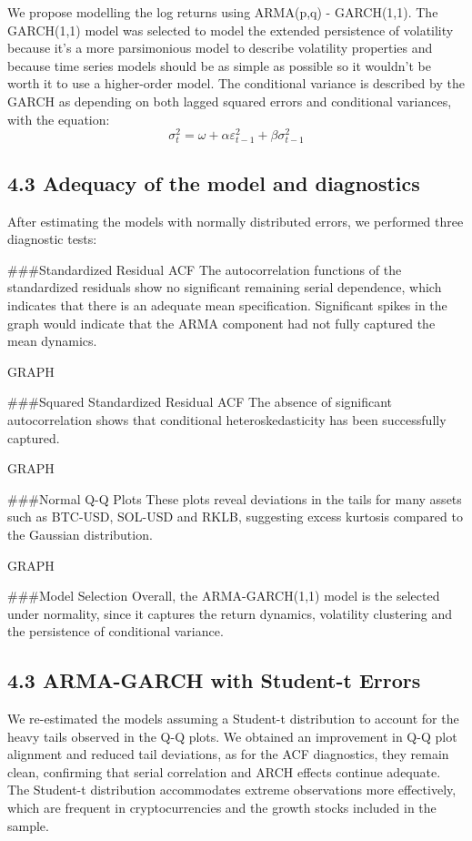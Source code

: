 \documentclass[
]{article}
\begin{document}
We propose modelling the log returns using ARMA(p,q) - GARCH(1,1). The
GARCH(1,1) model was selected to model the extended persistence of
volatility because it's a more parsimonious model to describe volatility
properties and because time series models should be as simple as
possible so it wouldn't be worth it to use a higher-order model. The
conditional variance is described by the GARCH as depending on both
lagged squared errors and conditional variances, with the equation: \[
\sigma_t^2 = \omega + \alpha \varepsilon_{t-1}^2 + \beta \sigma_{t-1}^2
\]

\subsection{4.3 Adequacy of the model and
diagnostics}\label{adequacy-of-the-model-and-diagnostics}

After estimating the models with normally distributed errors, we
performed three diagnostic tests:

\#\#\#Standardized Residual ACF The autocorrelation functions of the
standardized residuals show no significant remaining serial dependence,
which indicates that there is an adequate mean specification.
Significant spikes in the graph would indicate that the ARMA component
had not fully captured the mean dynamics.

GRAPH

\#\#\#Squared Standardized Residual ACF The absence of significant
autocorrelation shows that conditional heteroskedasticity has been
successfully captured.

GRAPH

\#\#\#Normal Q-Q Plots These plots reveal deviations in the tails for
many assets such as BTC-USD, SOL-USD and RKLB, suggesting excess
kurtosis compared to the Gaussian distribution.

GRAPH

\#\#\#Model Selection Overall, the ARMA-GARCH(1,1) model is the selected
under normality, since it captures the return dynamics, volatility
clustering and the persistence of conditional variance.

\subsection{4.3 ARMA-GARCH with Student-t
Errors}\label{arma-garch-with-student-t-errors}

We re-estimated the models assuming a Student-t distribution to account
for the heavy tails observed in the Q-Q plots. We obtained an
improvement in Q-Q plot alignment and reduced tail deviations, as for
the ACF diagnostics, they remain clean, confirming that serial
correlation and ARCH effects continue adequate. The Student-t
distribution accommodates extreme observations more effectively, which
are frequent in cryptocurrencies and the growth stocks included in the
sample.
\end{document}
